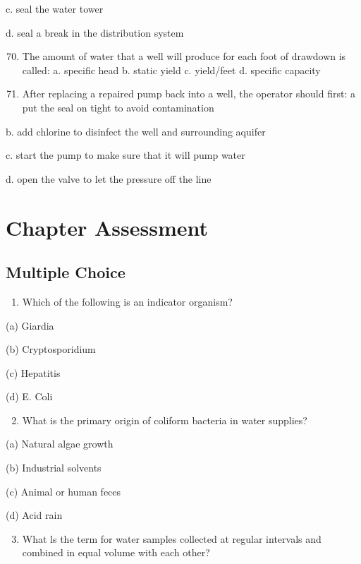 \documentclass[10pt]{article}
\begin{document}
c. seal the water tower

d. seal a break in the distribution system

\begin{enumerate}
  \setcounter{enumi}{69}
  \item The amount of water that a well will produce for each foot of drawdown is called:
a. specific head
b. static yield
c. yield/feet
d. specific capacity

  \item After replacing a repaired pump back into a well, the operator should first: a put the seal on tight to avoid contamination

\end{enumerate}

b. add chlorine to disinfect the well and surrounding aquifer

c. start the pump to make sure that it will pump water

d. open the valve to let the pressure off the line

\newpage
\section{Chapter Assessment}
\subsection{Multiple Choice}
\begin{enumerate}
  \item Which of the following is an indicator organism?
\end{enumerate}

(a) Giardia

(b) Cryptosporidium

(c) Hepatitis

(d) E. Coli

\begin{enumerate}
  \setcounter{enumi}{1}
  \item What is the primary origin of coliform bacteria in water supplies?
\end{enumerate}

(a) Natural algae growth

(b) Industrial solvents

(c) Animal or human feces

(d) Acid rain

\begin{enumerate}
  \setcounter{enumi}{2}
  \item What ls the term for water samples collected at regular intervals and combined in equal volume with each other?
\end{enumerate}
\end{document}
